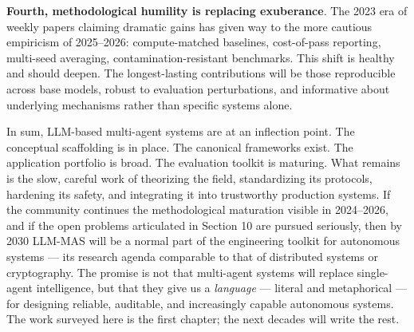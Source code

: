 \documentclass{article}
\begin{document}
\textbf{Fourth, methodological humility is replacing exuberance}. The 2023 era of weekly papers claiming dramatic gains has given way to the more cautious empiricism of 2025--2026: compute-matched baselines, cost-of-pass reporting, multi-seed averaging, contamination-resistant benchmarks. This shift is healthy and should deepen. The longest-lasting contributions will be those reproducible across base models, robust to evaluation perturbations, and informative about underlying mechanisms rather than specific systems alone.

In sum, LLM-based multi-agent systems are at an inflection point. The conceptual scaffolding is in place. The canonical frameworks exist. The application portfolio is broad. The evaluation toolkit is maturing. What remains is the slow, careful work of theorizing the field, standardizing its protocols, hardening its safety, and integrating it into trustworthy production systems. If the community continues the methodological maturation visible in 2024--2026, and if the open problems articulated in Section 10 are pursued seriously, then by 2030 LLM-MAS will be a normal part of the engineering toolkit for autonomous systems --- its research agenda comparable to that of distributed systems or cryptography. The promise is not that multi-agent systems will replace single-agent intelligence, but that they give us a \emph{language} --- literal and metaphorical --- for designing reliable, auditable, and increasingly capable autonomous systems. The work surveyed here is the first chapter; the next decades will write the rest.



\end{document}
